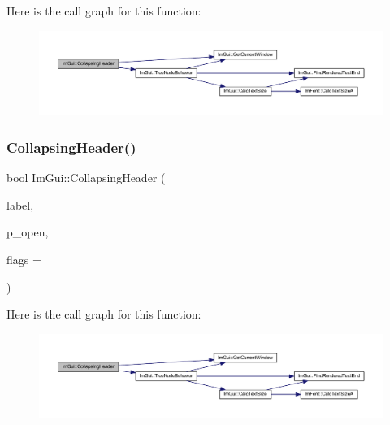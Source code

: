 Here is the call graph for this function\+:
\nopagebreak
\begin{figure}[H]
\begin{center}
\leavevmode
\includegraphics[width=350pt]{namespace_im_gui_ab52f9e08698c9d64abb05b98f5355146_cgraph}
\end{center}
\end{figure}
\mbox{\label{namespace_im_gui_a19f369fc61f49ab7995ebb4da99028db}} 
\subsubsection{\texorpdfstring{Collapsing\+Header()}{CollapsingHeader()}\hspace{0.1cm}{\footnotesize\ttfamily [2/2]}}
{\footnotesize\ttfamily bool Im\+Gui\+::\+Collapsing\+Header (\begin{DoxyParamCaption}\item[{const char $\ast$}]{label,  }\item[{bool $\ast$}]{p\+\_\+open,  }\item[{\mbox{\hyperlink{imgui_8h_a0588fdd10c59b49a0159484fe9ec4564}{Im\+Gui\+Tree\+Node\+Flags}}}]{flags = {} }\end{DoxyParamCaption})}

Here is the call graph for this function\+:
\nopagebreak
\begin{figure}[H]
\begin{center}
\leavevmode
\includegraphics[width=350pt]{namespace_im_gui_a19f369fc61f49ab7995ebb4da99028db_cgraph}
\end{center}
\end{figure}
\mbox{\label{namespace_im_gui_a82b18bfe08594b76c08894848d1e6fce}} 
